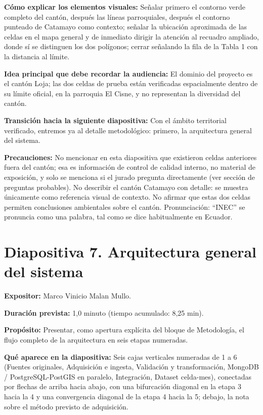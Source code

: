 \documentclass[11pt,a4paper]{article}
\newcommand{\campo}[2]{\par\medskip\noindent\textbf{#1:} #2\par}
\newcommand{\separadordiapositiva}{\bigskip\noindent{\color{Tierra!60}\hrulefill}\bigskip}
\begin{document}
\campo{C\'omo explicar los elementos visuales}{Se\~nalar primero el
contorno verde completo del cant\'on, despu\'es las l\'ineas
parroquiales, despu\'es el contorno punteado de Catamayo como
contexto; se\~nalar la ubicaci\'on aproximada de las celdas en el mapa
general y de inmediato dirigir la atenci\'on al recuadro ampliado,
donde s\'i se distinguen los dos pol\'igonos; cerrar se\~nalando la
fila de la Tabla 1 con la distancia al l\'imite.}
\campo{Idea principal que debe recordar la audiencia}{El dominio del
proyecto es el cant\'on Loja; las dos celdas de prueba est\'an
verificadas espacialmente dentro de su l\'imite oficial, en la
parroquia El Cisne, y no representan la diversidad del cant\'on.}
\campo{Transici\'on hacia la siguiente diapositiva}{Con el \'ambito
territorial verificado, entremos ya al detalle metodol\'ogico: primero,
la arquitectura general del sistema.}
\campo{Precauciones}{No mencionar en esta diapositiva que existieron
celdas anteriores fuera del cant\'on; esa es informaci\'on de control
de calidad interno, no material de exposici\'on, y solo se menciona si
el jurado pregunta directamente (ver secci\'on de preguntas
probables). No describir el cant\'on Catamayo con detalle: se muestra
\'unicamente como referencia visual de contexto. No afirmar que estas
dos celdas permiten conclusiones ambientales sobre el cant\'on.
Pronunciaci\'on: ``INEC'' se pronuncia como una palabra, tal como se
dice habitualmente en Ecuador.}

\separadordiapositiva

\section*{Diapositiva 7. Arquitectura general del sistema}

\campo{Expositor}{Marco Vinicio Malan Mullo.}
\campo{Duraci\'on prevista}{1,0 minuto (tiempo acumulado: 8,25 min).}
\campo{Prop\'osito}{Presentar, como apertura expl\'icita del bloque de
Metodolog\'ia, el flujo completo de la arquitectura en seis etapas
numeradas.}
\campo{Qu\'e aparece en la diapositiva}{Seis cajas verticales numeradas
de 1 a 6 (Fuentes originales, Adquisici\'on e ingesta, Validaci\'on y
transformaci\'on, MongoDB / PostgreSQL-PostGIS en paralelo,
Integraci\'on, Dataset celda-mes), conectadas por flechas de arriba
hacia abajo, con una bifurcaci\'on diagonal en la etapa 3 hacia la 4 y
una convergencia diagonal de la etapa 4 hacia la 5; debajo, la nota
sobre el m\'etodo previsto de adquisici\'on.}
\end{document}
